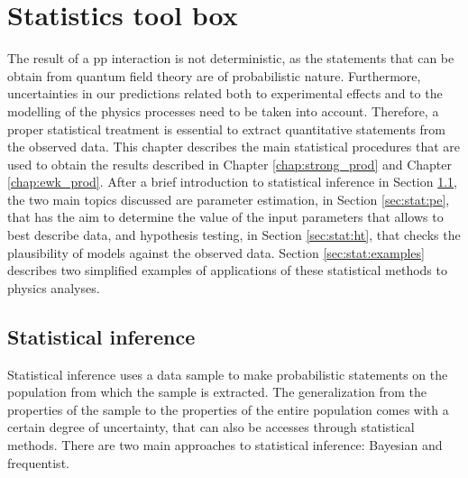 \chapter{Statistics tool box}
\label{chap:stat}

The result of a \gls{pp} interaction is not deterministic, as the statements that can be obtain from quantum field theory are of probabilistic nature. 
Furthermore, uncertainties in our predictions related both to experimental effects and to the modelling of the physics processes need to be taken into account. 
Therefore, a proper statistical treatment is essential to extract quantitative statements from the observed data. 
This chapter describes the main statistical procedures that are used to obtain the results described in Chapter \ref{chap:strong_prod} and Chapter \ref{chap:ewk_prod}. After a brief introduction to statistical inference in Section \ref{sec:stat:intro}, the two main topics discussed are parameter estimation, in Section \ref{sec:stat:pe}, that has the aim to determine the value of the input parameters that allows to best describe data, and hypothesis testing, in Section \ref{sec:stat:ht}, that checks the plausibility of models against the observed data. 
Section \ref{sec:stat:examples} describes two simplified examples of applications of these statistical methods to physics analyses. 

\section{Statistical inference}
\label{sec:stat:intro}

Statistical inference uses a data sample to make probabilistic statements on the population from which the sample is extracted. The generalization from the properties of the sample to the properties of the entire population comes with a certain degree of uncertainty, that can also be accesses through statistical methods.
There are two main approaches to statistical inference: Bayesian and frequentist.

